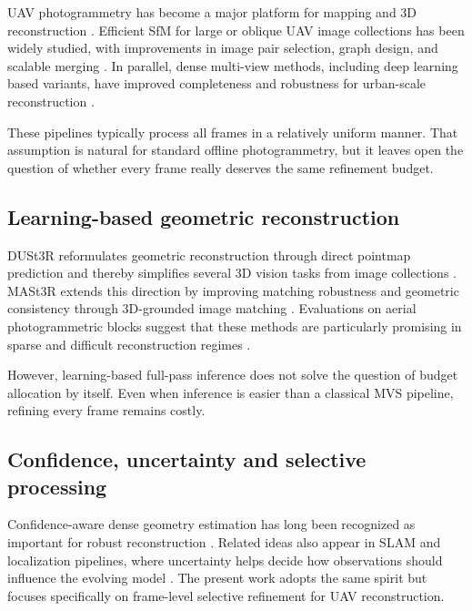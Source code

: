 \documentclass[preprint,12pt]{elsarticle}
\begin{document}
UAV photogrammetry has become a major platform for mapping and 3D reconstruction \citep{Colomina2014Unmanned}. Efficient SfM for large or oblique UAV image collections has been widely studied, with improvements in image pair selection, graph design, and scalable merging \citep{Jiang2017Efficient,Jiang2020Efficient,Jiang2022Leveraging,Jiang2022Parallel,Jiang2024Efficient}. In parallel, dense multi-view methods, including deep learning based variants, have improved completeness and robustness for urban-scale reconstruction \citep{Liu2023Deep,Liao2024High}.

These pipelines typically process all frames in a relatively uniform manner. That assumption is natural for standard offline photogrammetry, but it leaves open the question of whether every frame really deserves the same refinement budget.

\subsection{Learning-based geometric reconstruction}

DUSt3R reformulates geometric reconstruction through direct pointmap prediction and thereby simplifies several 3D vision tasks from image collections \citep{Wang2024DUSt3R}. MASt3R extends this direction by improving matching robustness and geometric consistency through 3D-grounded image matching \citep{Leroy2024MASt3R}. Evaluations on aerial photogrammetric blocks suggest that these methods are particularly promising in sparse and difficult reconstruction regimes \citep{Wu2025AerialBlocks}.

However, learning-based full-pass inference does not solve the question of budget allocation by itself. Even when inference is easier than a classical MVS pipeline, refining every frame remains costly.

\subsection{Confidence, uncertainty and selective processing}

Confidence-aware dense geometry estimation has long been recognized as important for robust reconstruction \citep{Li2020Confidence}. Related ideas also appear in SLAM and localization pipelines, where uncertainty helps decide how observations should influence the evolving model \citep{Campos2021ORB,Qin2018VINS,Wang2024Benchmarking}. The present work adopts the same spirit but focuses specifically on frame-level selective refinement for UAV reconstruction.
\end{document}
